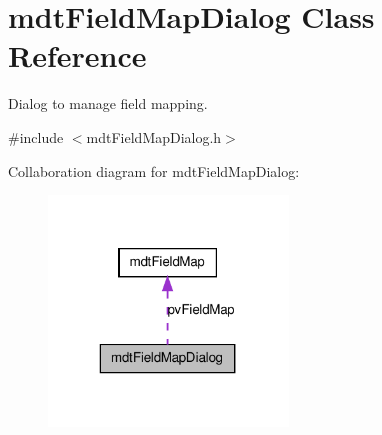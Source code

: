 \hypertarget{classmdt_field_map_dialog}{
\section{mdtFieldMapDialog Class Reference}
\label{classmdt_field_map_dialog}
}


Dialog to manage field mapping.  




{\ttfamily \#include $<$mdtFieldMapDialog.h$>$}



Collaboration diagram for mdtFieldMapDialog:
\nopagebreak
\begin{figure}[H]
\begin{center}
\leavevmode
\includegraphics[width=181pt]{classmdt_field_map_dialog__coll__graph}
\end{center}
\end{figure}
